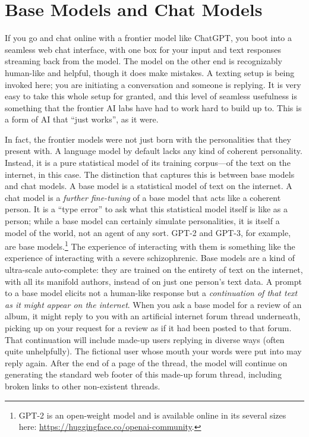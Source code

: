 \section{Base Models and Chat Models}
If you go and chat online with a frontier model like ChatGPT, you boot into a
seamless web chat interface, with one box for your input and text responses
streaming back from the model. The model on the other end is recognizably
human-like and helpful, though it does make mistakes. A texting setup is being
invoked here; you are initiating a conversation and someone is replying. It is
very easy to take this whole setup for granted, and this level of seamless
usefulness is something that the frontier AI labs have had to work hard to
build up to. This is a form of AI that ``just works'', as it were.

In fact, the frontier models were not just born with the personalities that
they present with. A language model by default lacks any kind of coherent
personality. Instead, it is a pure statistical model of its training
corpus---of the text on the internet, in this case. The distinction that
captures this is between base models and chat models. A base model is a
statistical model of text on the internet. A chat model is a \emph{further
fine-tuning} of a base model that acts like a coherent person. It is a ``type
error'' to ask what this statistical model itself is like as a person; while a
base model can certainly simulate personalities, it is itself a model of the
world, not an agent of any sort. GPT-2 and GPT-3, for example, are base
models.\footnote{GPT-2 is an open-weight model and is available online in its
several sizes here: \url{https://huggingface.co/openai-community}.} The
experience of interacting with them is something like the experience of
interacting with a severe schizophrenic. Base models are a kind of ultra-scale
auto-complete: they are trained on the entirety of text on the internet, with
all its manifold authors, instead of on just one person's text data. A prompt
to a base model elicits not a human-like response but a \emph{continuation of
that text as it might appear on the internet}. When you ask a base model for a
review of an album, it might reply to you with an artificial internet forum
thread underneath, picking up on your request for a review as if it had been
posted to that forum. That continuation will include made-up users replying in
diverse ways (often quite unhelpfully). The fictional user whose mouth your
words were put into may reply again. After the end of a page of the thread, the
model will continue on generating the standard web footer of this made-up forum
thread, including broken links to other non-existent threads.

